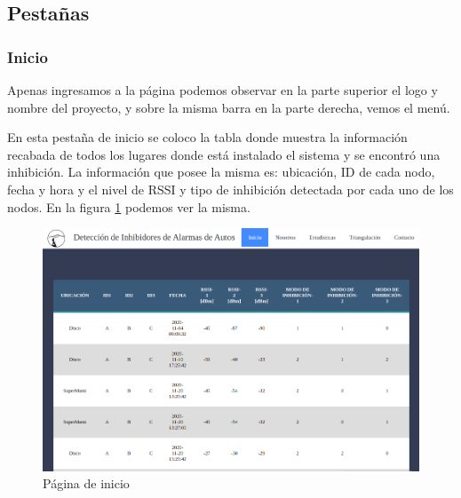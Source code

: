 \subsection{Pestañas}
\subsubsection{Inicio}
Apenas ingresamos a la página podemos observar en la parte superior el logo y nombre del proyecto, y sobre la misma barra en la parte derecha, vemos el menú.
\par En esta pestaña de inicio se coloco la tabla donde muestra la información recabada de todos los lugares donde está instalado el sistema y se encontró una inhibición. La información que posee la misma es: ubicación, ID de cada nodo, fecha y hora y el nivel de RSSI y tipo de inhibición detectada por cada uno de los nodos. En la figura \ref{web_inicio} podemos ver la misma. 
\begin{figure}[h!]
	\centering
	\includegraphics[scale=0.32]{images/web/tabla-web.png}
    \caption{Página de inicio}
	\label{web_inicio}
\end{figure}
